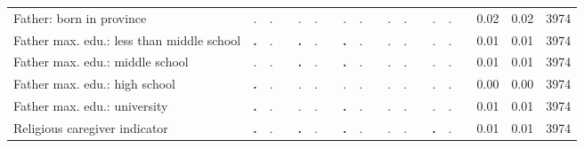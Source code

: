 \begin{tabular}{l c c c c c c c c c c c c c c c c c c}
Father: born in province &         . &         . & &         . &         . & &         . &         . & &         . &         . & &         . &         . & &      0.02 &      0.02 &      3974 \\
Father max. edu.: less than middle school & \textbf{        .} &         . & & \textbf{        .} &         . & & \textbf{        .} &         . & &         . &         . & &         . &         . & &      0.01 &      0.01 &      3974 \\
Father max. edu.: middle school &         . &         . & & \textbf{        .} &         . & & \textbf{        .} &         . & &         . &         . & &         . &         . & &      0.01 &      0.01 &      3974 \\
Father max. edu.: high school & \textbf{        .} &         . & &         . &         . & &         . &         . & &         . &         . & &         . &         . & &      0.00 &      0.00 &      3974 \\
Father max. edu.: university & \textbf{        .} &         . & &         . &         . & & \textbf{        .} &         . & &         . &         . & &         . &         . & &      0.01 &      0.01 &      3974 \\
Religious caregiver indicator & \textbf{        .} &         . & & \textbf{        .} &         . & & \textbf{        .} &         . & &         . &         . & & \textbf{        .} &         . & &      0.01 &      0.01 &      3974 \\
\bottomrule
\end{tabular}
